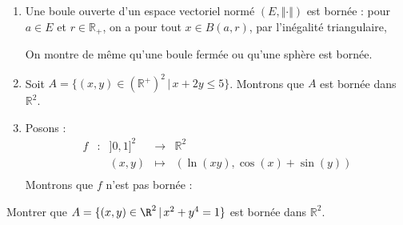 \documentclass[french,11pt,twoside]{VcCours}
\begin{document}
\begin{Exemples}
\begin{enumerate}
\item Une boule ouverte d'un espace vectoriel normé $(E, \Vert \cdot \Vert)$ est bornée : pour $a \in E$ et $r \in \mathbb{R}_+$, on a pour tout $x \in B(a,r)$, par l'inégalité triangulaire,

\vspace{2cm}
On montre de même qu'une boule fermée ou qu'une sphère est bornée.
\item Soit $A = \lbrace (x,y) \in (\mathbb{R}^+)^2 \, \vert \, x+2y \leq 5 \rbrace$. Montrons que $A$ est bornée dans $\mathbb{R}^2$.

\vspace{4cm}
\item Posons :
$$ \begin{array}{ccccl}
f & : & ]0,1]^2 & \rightarrow & \mathbb{R}^2 \\
& & (x,y)   & \mapsto & (\ln(xy), \cos(x)+ \sin(y)) \\
\end{array}$$
Montrons que $f$ n'est pas bornée : 

\vspace{4cm}
\end{enumerate}
\end{Exemples}

\begin{ApplicationDirecte} Montrer que $A = \lbrace (x,y)\in\R^2 \, \vert \, x^2+y^4=1 \rbrace$ est bornée dans $\mathbb{R}^2$.
\end{ApplicationDirecte}
\end{document}
